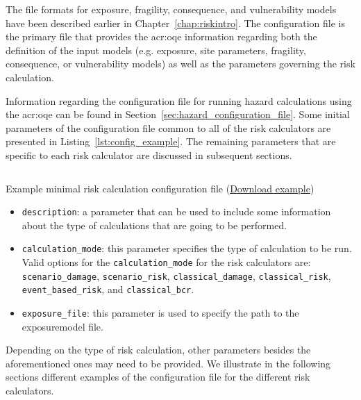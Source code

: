 The file formats for exposure, fragility, consequence, and vulnerability
models have been described earlier in Chapter~\ref{chap:riskintro}. The
configuration file is the primary file that provides the \glsdesc{acr:oqe}
information regarding both the definition of the input models (e.g. exposure,
site parameters, fragility, consequence, or vulnerability models) as well as
the parameters governing the risk calculation.

Information regarding the configuration file for running hazard calculations
using the \glsdesc{acr:oqe} can be found in
Section~\ref{sec:hazard_configuration_file}. Some initial parameters of the
configuration file common to all of the risk calculators are presented in
Listing~\ref{lst:config_example}. The remaining parameters that are specific
to each risk calculator are discussed in subsequent sections.

\begin{listing}[htbp]
  \inputminted[firstline=1,firstnumber=1,fontsize=\footnotesize,frame=single,linenos,bgcolor=lightgray]{ini}{oqum/risk/Verbatim/config_example.ini}
  \caption{Example minimal risk calculation configuration file (\href{https://raw.githubusercontent.com/GEMScienceTools/oq-engine-docs/master/oqum/risk/verbatim/config_example.xml}{Download example})}
  \label{lst:config_example}
\end{listing}

\begin{itemize}

  \item \Verb+description+: a parameter that can be used to include some
  information about the type of calculations that are going to be performed.

  \item \Verb+calculation_mode+: this parameter specifies the type of
  calculation to be run. Valid options for the \Verb+calculation_mode+ for
  the risk calculators are: \Verb+scenario_damage+, \Verb+scenario_risk+,
  \Verb+classical_damage+, \Verb+classical_risk+, \Verb+event_based_risk+,
  and \Verb+classical_bcr+.

  \item \Verb+exposure_file+: this parameter is used to specify the path to
  the \gls{exposuremodel} file.

\end{itemize}

Depending on the type of risk calculation, other parameters besides the
aforementioned ones may need to be provided. We illustrate in the following
sections different examples of the configuration file for the different risk
calculators.


